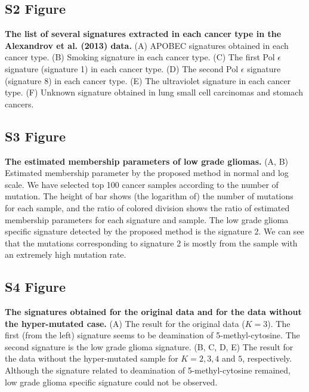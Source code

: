 \documentclass[10pt,letterpaper]{article}
\begin{document}
\subsection*{S2 Figure}
\label{nature2013_sig_list}
{\bf The list of several signatures extracted in each cancer type in the Alexandrov et al. (2013) data.}
(A) APOBEC signatures obtained in each cancer type.
(B) Smoking signature in each cancer type.
(C) The first Pol $\epsilon$ signature (signature 1)  in each cancer type.
(D) The second Pol $\epsilon$ signature (signature 8) in each cancer type.
(E) The ultraviolet signature in each cancer type.
(F) Unknown signature obtained in lung small cell carcinomas and stomach cancers.


\subsection*{S3 Figure}
\label{LGG_membership}
{\bf The estimated membership parameters of low grade gliomas.}
(A, B) Estimated membership parameter by the proposed method in normal and log scale.
We have selected top 100 cancer samples according to the number of mutation.
The height of bar shows (the logarithm of) the number of mutations for each sample,
and the ratio of colored division shows the ratio of estimated membership parameters for each signature and sample.
The low grade glioma specific signature detected by the proposed method is the signature 2.
We can see that the mutations corresponding to signature 2 is mostly from the sample with an extremely high mutation rate.


\subsection*{S4 Figure}
\label{LGG_signatures}
{\bf The signatures obtained for the original data and for the data without the hyper-mutated case.}
(A) The result for the original data ($K = 3$). The first (from the left) signature seems to be deamination of 5-methyl-cytosine. 
  The second signature is the low grade glioma signature.
(B, C, D, E) The result for the data without the hyper-mutated sample for $K = 2, 3, 4$ and $5$, respectively.
Although the signature related to deamination of 5-methyl-cytosine remained, low grade glioma specific signature could not be observed.
\end{document}
